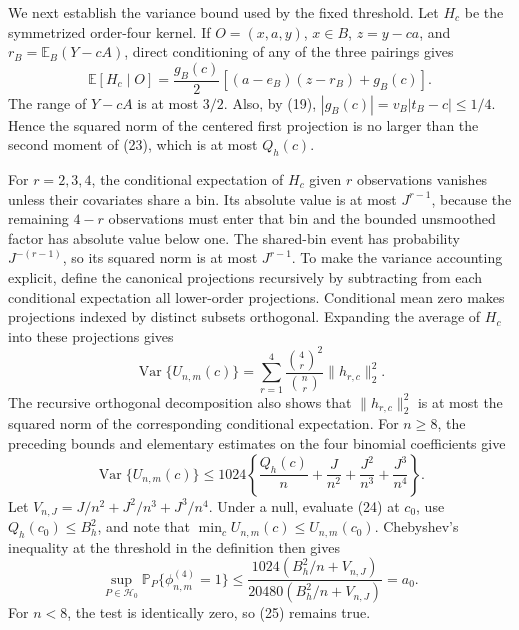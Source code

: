 We next establish the variance bound used by the fixed threshold. Let \(H_c\) be the symmetrized order-four kernel. If \(O=(x,a,y)\), \(x\in B\), \(z=y-ca\), and \(r_B=\mathbb E_B(Y-cA)\), direct conditioning of any of the three pairings gives
\[
 \mathbb E[H_c\mid O]
 =\frac{g_B(c)}2\left[(a-e_B)(z-r_B)+g_B(c)\right].                  \tag{23}
\]
The range of \(Y-cA\) is at most \(3/2\). Also, by (19), \(|g_B(c)|=v_B|t_B-c|\le1/4\). Hence the squared norm of the centered first projection is no larger than the second moment of (23), which is at most \(Q_h(c)\).

For \(r=2,3,4\), the conditional expectation of \(H_c\) given \(r\) observations vanishes unless their covariates share a bin. Its absolute value is at most \(J^{r-1}\), because the remaining \(4-r\) observations must enter that bin and the bounded unsmoothed factor has absolute value below one. The shared-bin event has probability \(J^{-(r-1)}\), so its squared norm is at most \(J^{r-1}\). To make the variance accounting explicit, define the canonical projections recursively by subtracting from each conditional expectation all lower-order projections. Conditional mean zero makes projections indexed by distinct subsets orthogonal. Expanding the average of \(H_c\) into these projections gives
\[
 \operatorname{Var}\{U_{n,m}(c)\}
 =\sum_{r=1}^4\frac{\binom4r^2}{\binom nr}\lVert h_{r,c}\rVert_2^2.
\]
The recursive orthogonal decomposition also shows that \(\lVert h_{r,c}\rVert_2^2\) is at most the squared norm of the corresponding conditional expectation. For \(n\ge8\), the preceding bounds and elementary estimates on the four binomial coefficients give
\[
 \operatorname{Var}\{U_{n,m}(c)\}
 \le1024\left\{\frac{Q_h(c)}n+\frac{J}{n^2}
 +\frac{J^2}{n^3}+\frac{J^3}{n^4}\right\}.                           \tag{24}
\]
Let \(V_{n,J}=J/n^2+J^2/n^3+J^3/n^4\). Under a null, evaluate (24) at \(c_0\), use \(Q_h(c_0)\le B_h^2\), and note that \(\min_cU_{n,m}(c)\le U_{n,m}(c_0)\). Chebyshev's inequality at the threshold in the definition then gives
\[
 \sup_{P\in\mathcal H_0}\mathbb P_P\{\phi_{n,m}^{(4)}=1\}
 \le\frac{1024(B_h^2/n+V_{n,J})}{20480(B_h^2/n+V_{n,J})}
 =a_0.                                                               \tag{25}
\]
For \(n<8\), the test is identically zero, so (25) remains true.


